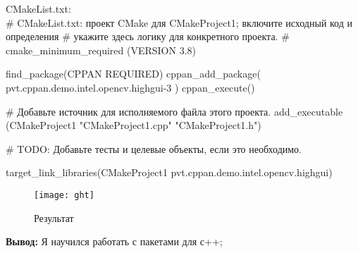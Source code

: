 \newpage
CMakeList.txt:\\

\# CMakeList.txt: проект CMake для CMakeProject1; включите исходный код и определения
\# укажите здесь логику для конкретного проекта.
\#
cmake\_minimum\_required (VERSION 3.8)

find\_package(CPPAN REQUIRED)
cppan\_add\_package(
	pvt.cppan.demo.intel.opencv.highgui-3
)
cppan\_execute()

\# Добавьте источник для исполняемого файла этого проекта.
add\_executable (CMakeProject1 "CMakeProject1.cpp" "CMakeProject1.h")

\# TODO: Добавьте тесты и целевые объекты, если это необходимо.
			
target\_link\_libraries(CMakeProject1 pvt.cppan.demo.intel.opencv.highgui)


\begin{figure}[h]
\centering
\texttt{[image: ght]}
\caption{Результат}
\label{fig:ght}
\end{figure}


\textbf{Вывод:} Я научился работать с пакетами для с++;



